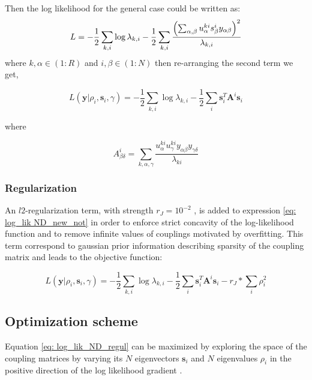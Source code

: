 \documentclass[reprint,amsmath,amssymb,superscriptaddress,showpacs,pre]{revtex4-1}
\let\originalleft\left
\let\originalright\right
\renewcommand{\left}{\mathopen{}\mathclose\bgroup\originalleft}
\renewcommand{\right}{\aftergroup\egroup\originalright}
\begin{document}
Then the log likelihood for the general case could be written as:
\begin{equation}
L= -\frac 1 2\sum_{k,i}\log\lambda_{k,i}-\frac 1 2 \sum_{k,i} \frac{\left( \sum_{\alpha,\beta} u^{ki}_{\alpha} s^{i}_{\beta} y_{\alpha\beta} \right) ^2}{\lambda_{k,i}}
\label{eq: log_lik ND}
\end{equation}
where $k,\alpha \in (1:R)$ and $i,\beta \in (1:N)$ then re-arranging the second term we get,


\begin{equation}
L(\mathbf{y}|\rho_i,\mathbf{s}_i,\gamma)= -\frac 1 2\sum_{k,i}\log\lambda_{k,i}-\frac{1}{2}  \sum_{i} \mathbf{s}_i^{T} \mathbf{A}^{i} \mathbf{s}_i
\label{eq: log_lik ND_new_not}
\end{equation}

where 

\begin{equation}
A^{i}_{\beta\delta}=\sum_{k,\alpha,\gamma} \frac{u^{ki}_{\alpha}  u^{ki}_{\gamma}y_{\alpha\beta} y_{\gamma\delta}}{\lambda_{ki}}
\end{equation}

\subsubsection{Regularization}
An $l2$-regularization term, with strength $r_J=10^{-2}$ , is added to expression \ref{eq: log_lik ND_new_not} in order to enforce strict concavity of the log-likelihood function and to remove infinite values of couplings motivated by  overfitting. This term correspond to gaussian prior information describing sparsity of the coupling matrix and leads to the objective function:

\begin{equation}
L(\mathbf{y}|\rho_i,\mathbf{s}_i,\gamma)= -\frac 1 2\sum_{k,i}\log\lambda_{k,i}-\frac{1}{2}  \sum_{i} \mathbf{s}_i^{T} \mathbf{A}^{i} \mathbf{s}_i- r_J*\sum_{i} \rho^2_i
\label{eq: log_lik_ND_regul}
\end{equation}




\subsection{Optimization scheme}


Equation \ref{eq: log_lik_ND_regul}  can be maximized by exploring the space of the coupling matrices by varying its $ N $ eigenvectors $\mathbf{s}_i$  and $ N $ eigenvalues $\rho_i$ in the positive direction of the log likelihood gradient .
\end{document}
